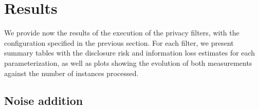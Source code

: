 \section{Results}
\label{Benchmarking:Results}

We provide now the results of the execution of the privacy filters, with the configuration specified in the previous section. For each filter, we present summary tables with the disclosure risk and information loss estimates for each parameterization, as well as plots showing the evolution of both measurements against the number of instances processed.

\subsection{Noise addition}
\label{Benchmarking:Results:Noise}

